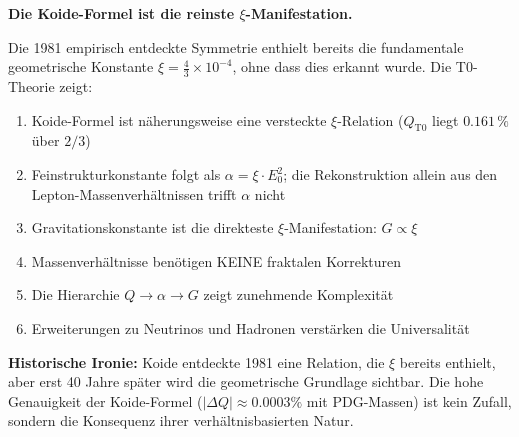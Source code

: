 	\begin{theorem}
		\textbf{Die Koide-Formel ist die reinste $\xi$-Manifestation.}
		
		Die 1981 empirisch entdeckte Symmetrie enthielt bereits die fundamentale geometrische Konstante $\xi = \frac{4}{3} \times 10^{-4}$, ohne dass dies erkannt wurde. Die T0-Theorie zeigt:
		
		\begin{enumerate}
			\item Koide-Formel ist näherungsweise eine versteckte $\xi$-Relation ($Q_{\text{T0}}$ liegt $0.161\,\%$ über $2/3$)
			\item Feinstrukturkonstante folgt als $\alpha = \xi \cdot E_0^2$; die Rekonstruktion allein aus den Lepton-Massenverhältnissen trifft $\alpha$ nicht
			\item Gravitationskonstante ist die direkteste $\xi$-Manifestation: $G \propto \xi$
			\item Massenverhältnisse benötigen KEINE fraktalen Korrekturen
			\item Die Hierarchie $Q \to \alpha \to G$ zeigt zunehmende Komplexität
			\item Erweiterungen zu Neutrinos und Hadronen verstärken die Universalität
		\end{enumerate}
	\end{theorem}
	
	\vspace{1cm}
	
	\noindent\textbf{Historische Ironie:} Koide entdeckte 1981 eine Relation, die $\xi$ bereits enthielt, aber erst 40 Jahre später wird die geometrische Grundlage sichtbar. Die hohe Genauigkeit der Koide-Formel ($|\Delta Q| \approx 0.0003\%$ mit PDG-Massen) ist kein Zufall, sondern die Konsequenz ihrer verhältnisbasierten Natur.
	
